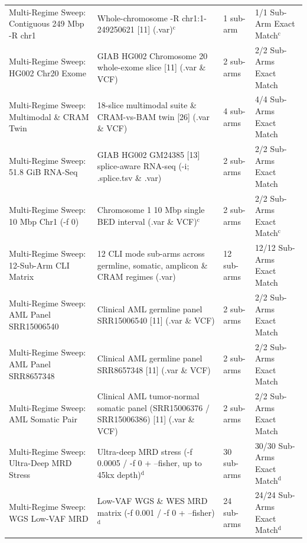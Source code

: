 \begin{table}[htbp]
{\begin{tabular}{llll}
Multi-Regime Sweep: Contiguous 249 Mbp -R chr1 & Whole-chromosome -R chr1:1-249250621 [11] (.var)$^{\text{c}}$ & 1 sub-arm & 1/1 Sub-Arm Exact Match$^{\text{c}}$ \\
Multi-Regime Sweep: HG002 Chr20 Exome & GIAB HG002 Chromosome 20 whole-exome slice [11] (.var \& VCF) & 2 sub-arms & 2/2 Sub-Arms Exact Match \\
Multi-Regime Sweep: Multimodal \& CRAM Twin & 18-slice multimodal suite \& CRAM-vs-BAM twin [26] (.var \& VCF) & 4 sub-arms & 4/4 Sub-Arms Exact Match \\
Multi-Regime Sweep: 51.8 GiB RNA-Seq & GIAB HG002 GM24385 [13] splice-aware RNA-seq (-i; .splice.tsv \& .var) & 2 sub-arms & 2/2 Sub-Arms Exact Match \\
Multi-Regime Sweep: 10 Mbp Chr1 (-f 0) & Chromosome 1 10 Mbp single BED interval (.var \& VCF)$^{\text{c}}$ & 2 sub-arms & 2/2 Sub-Arms Exact Match$^{\text{c}}$ \\
Multi-Regime Sweep: 12-Sub-Arm CLI Matrix & 12 CLI mode sub-arms across germline, somatic, amplicon \& CRAM regimes (.var) & 12 sub-arms & 12/12 Sub-Arms Exact Match \\
Multi-Regime Sweep: AML Panel SRR15006540 & Clinical AML germline panel SRR15006540 [11] (.var \& VCF) & 2 sub-arms & 2/2 Sub-Arms Exact Match \\
Multi-Regime Sweep: AML Panel SRR8657348 & Clinical AML germline panel SRR8657348 [11] (.var \& VCF) & 2 sub-arms & 2/2 Sub-Arms Exact Match \\
Multi-Regime Sweep: AML Somatic Pair & Clinical AML tumor-normal somatic panel (SRR15006376 / SRR15006386) [11] (.var \& VCF) & 2 sub-arms & 2/2 Sub-Arms Exact Match \\
Multi-Regime Sweep: Ultra-Deep MRD Stress & Ultra-deep MRD stress (-f 0.0005 / -f 0 + --fisher, up to 45kx depth)$^{\text{d}}$ & 30 sub-arms & 30/30 Sub-Arms Exact Match$^{\text{d}}$ \\
Multi-Regime Sweep: WGS Low-VAF MRD & Low-VAF WGS \& WES MRD matrix (-f 0.001 / -f 0 + --fisher)$^{\text{d}}$ & 24 sub-arms & 24/24 Sub-Arms Exact Match$^{\text{d}}$ \\
\hline
\end{tabular}%
}

\end{table}
